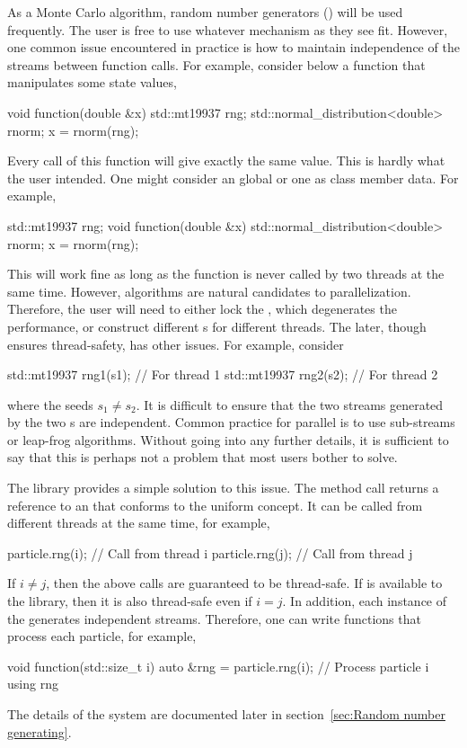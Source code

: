 \documentclass[11pt,bib,mint,hyper,altcolor]{marticle}
\begin{document}
As a Monte Carlo algorithm, random number generators (\rng) will be used
frequently. The user is free to use whatever \rng mechanism as they see fit.
However, one common issue encountered in practice is how to maintain
independence of the \rng streams between function calls. For example, consider
below a function that manipulates some state values,
\begin{cppcode}
  void function(double &x)
  {
      std::mt19937 rng;
      std::normal_distribution<double> rnorm;
      x = rnorm(rng);
  }
\end{cppcode}
Every call of this function will give  exactly the same value.
This is hardly what the user intended. One might consider an global \rng or one
as class member data. For example,
\begin{cppcode}
  std::mt19937 rng;
  void function(double &x)
  {
      std::normal_distribution<double> rnorm;
      x = rnorm(rng);
  }
\end{cppcode}
This will work fine as long as the function is never called by two threads at
the same time. However, \smc algorithms are natural candidates to
parallelization. Therefore, the user will need to either lock the \rng, which
degenerates the performance, or construct different \rng{}s for different
threads. The later, though ensures thread-safety, has other issues. For
example, consider
\begin{cppcode}
  std::mt19937 rng1(s1); // For thread 1
  std::mt19937 rng2(s2); // For thread 2
\end{cppcode}
where the seeds $s_1 \ne s_2$. It is difficult to ensure that the two streams
generated by the two \rng{}s are independent. Common practice for parallel
\rng is to use sub-streams or leap-frog algorithms. Without going into any
further details, it is sufficient to say that this is perhaps not a problem
that most users bother to solve.

The library provides a simple solution to this issue. The method call
 returns a reference to an \rng that conforms to the
\cppoo uniform \rng concept. It can be called from different threads at the
same time, for example,
\begin{cppcode}
  particle.rng(i); // Call from thread i
  particle.rng(j); // Call from thread j
\end{cppcode}
If $i \ne j$, then the above calls are guaranteed to be thread-safe. If \tbb is
available to the library, then it is also thread-safe even if $i = j$. In
addition, each instance of the \rng generates independent streams. Therefore,
one can write functions that process each particle, for example,
\begin{cppcode}
  void function(std::size_t i)
  {
      auto &rng = particle.rng(i);
      // Process particle i using rng
  }
\end{cppcode}
The details of the \rng system are documented later in section~\ref{sec:Random
  number generating}.
\end{document}
